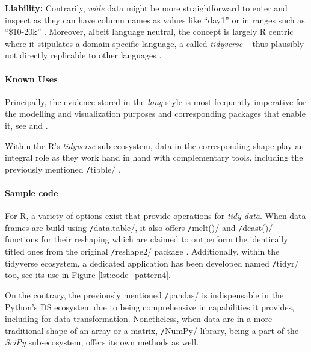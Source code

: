 \textbf{Liability:}
Contrarily, \emph{wide} data might be more straightforward to enter and inspect as they can have column names as values like \enquote{day1} or in ranges such as \enquote{\$10-20k} \parencites{WilsonGred2017}.
Moreover, albeit language neutral, the concept is largely R centric where it stipulates a domain-specific language, a  called \emph{tidyverse} -- thus plausibly not directly replicable to other languages \parencite{Rickert2017}. 

\paragraph*{Known Uses}
\begin{compactitem}
  \item Principally, the evidence stored in the \emph{long} style is most frequently imperative for the modelling and visualization purposes and corresponding packages that enable it, see  and  \parencite{TidyDataWickham2014}. 
  \item Within the R's \emph{tidyverse} sub-ecosystem, data in the corresponding shape play an integral role as they work hand in hand with complementary tools, including the previously mentioned \texttt/tibble/ \parencite{GarrettGrolemund2017RData}.
\end{compactitem}

\paragraph*{Sample code}
For R, a variety of options exist that provide operations for \emph{tidy data}.
When data frames are build using \texttt/data.table/, it also offers \texttt/melt()/ and \texttt/dcast()/ functions for their reshaping which are claimed to outperform the identically titled ones from the original \texttt/reshape2/ package \parencite{DataTable2017}.
Additionally, within the tidyverse ecosystem, a dedicated application has been developed named \texttt/tidyr/ too, see its use in Figure \ref{lst:code_pattern4}.

On the contrary, the previously mentioned \texttt/pandas/ is indispensable in the Python's \ac{DS} ecosystem due to being comprehensive in capabilities it provides, including for data transformation.
Nonetheless, when data are in a more traditional shape of an array or a matrix, \texttt/NumPy/ library, being a part of the \emph{SciPy} sub-ecosystem, offers its own methods as well.

